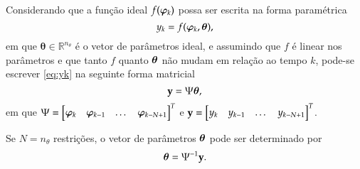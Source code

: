 Considerando que a função ideal $f(\bm{\varphi}_{k})$ possa ser escrita na forma paramétrica 
\begin{equation}
   y_k = f(\bm{\varphi}_{k},\bm{\theta}),
   \label{eq:yk}
\end{equation}
em que $\bm{\theta} \in \mathbb{R}^{n_\theta}$  é o vetor de parâmetros ideal, 
%
e assumindo que $f$ é linear nos parâmetros e que tanto $f$ quanto $\bm{\theta}$ não mudam em relação ao tempo $k$, pode-se escrever \eqref{eq:yk} na seguinte forma matricial
\begin{equation}
   \label{eq:yMatrix}
   \mathrm{\mathbf{y}} = \Psi\bm{\theta},
\end{equation}
em que $\Psi = \begin{bmatrix} \bm{\varphi}_{k} & \bm{\varphi}_{k-1} & \dots & \bm{\varphi}_ {k-N+1} \end{bmatrix}^T$ e $\mathrm{\mathbf{y}} = \begin{bmatrix} y_k & y_{k-1} & \dots & y_{k-N+1} \end{bmatrix}^T$.


Se $N=n_\theta$ restrições, o vetor de parâmetros $\bm{\theta}$ pode ser determinado por
\begin{equation}
   \bm{\theta} = \Psi^{-1}\mathrm{\mathbf{y}}
   \label{eq:thetaest}.
\end{equation}

